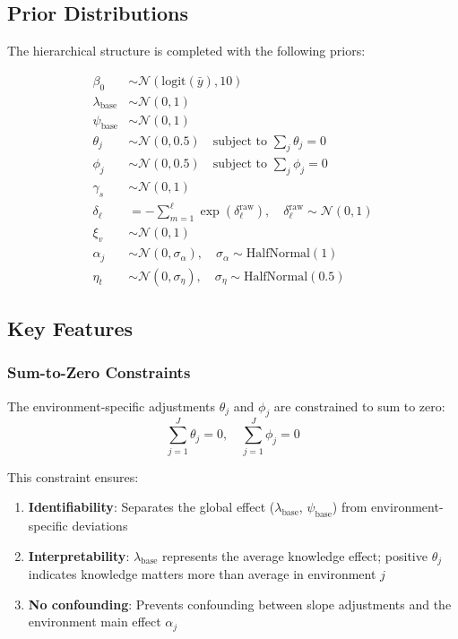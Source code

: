 \documentclass{article}
\begin{document}
\subsection{Prior Distributions}

The hierarchical structure is completed with the following priors:

\begin{align}
\beta_0 &\sim \mathcal{N}(\text{logit}(\bar{y}), 10) \\
\lambda_\text{base} &\sim \mathcal{N}(0, 1) \\
\psi_\text{base} &\sim \mathcal{N}(0, 1) \\
\theta_j &\sim \mathcal{N}(0, 0.5) \quad \text{subject to } \sum_j \theta_j = 0 \\
\phi_j &\sim \mathcal{N}(0, 0.5) \quad \text{subject to } \sum_j \phi_j = 0 \\
\gamma_s &\sim \mathcal{N}(0, 1) \\
\delta_\ell &= -\sum_{m=1}^\ell \exp(\delta_\ell^\text{raw}), \quad \delta_\ell^\text{raw} \sim \mathcal{N}(0, 1) \\
\xi_v &\sim \mathcal{N}(0, 1) \\
\alpha_j &\sim \mathcal{N}(0, \sigma_\alpha), \quad \sigma_\alpha \sim \text{HalfNormal}(1) \\
\eta_t &\sim \mathcal{N}(0, \sigma_\eta), \quad \sigma_\eta \sim \text{HalfNormal}(0.5)
\end{align}

\subsection{Key Features}

\subsubsection{Sum-to-Zero Constraints}
The environment-specific adjustments $\theta_j$ and $\phi_j$ are constrained to sum to zero:
\begin{equation}
\sum_{j=1}^{J} \theta_j = 0, \quad \sum_{j=1}^{J} \phi_j = 0
\end{equation}

This constraint ensures:
\begin{enumerate}
    \item \textbf{Identifiability}: Separates the global effect ($\lambda_\text{base}$, $\psi_\text{base}$) from environment-specific deviations
    \item \textbf{Interpretability}: $\lambda_\text{base}$ represents the average knowledge effect; positive $\theta_j$ indicates knowledge matters more than average in environment $j$
    \item \textbf{No confounding}: Prevents confounding between slope adjustments and the environment main effect $\alpha_j$
\end{enumerate}
\end{document}
